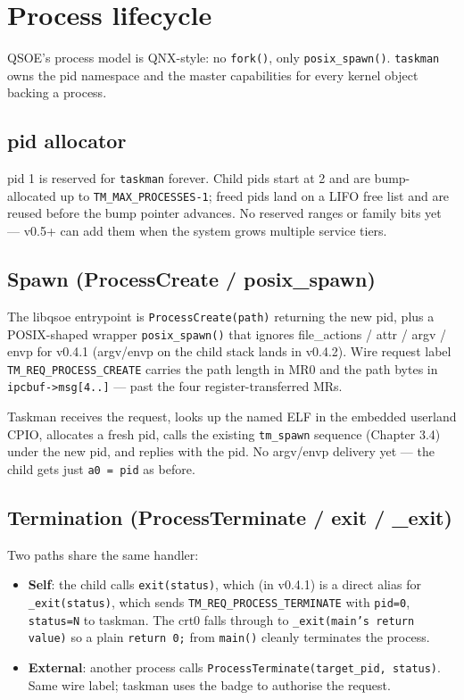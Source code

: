 \section{Process lifecycle}
\label{sec:process-lifecycle}

QSOE's process model is QNX-style: no \texttt{fork()}, only
\texttt{posix\_spawn()}.
\texttt{taskman} owns the pid namespace and the master capabilities
for every kernel object backing a process.

\subsection{pid allocator}

pid 1 is reserved for \texttt{taskman} forever.  Child pids start at
2 and are bump-allocated up to \texttt{TM\_MAX\_PROCESSES-1}; freed
pids land on a LIFO free list and are reused before the bump pointer
advances.  No reserved ranges or family bits yet --- v0.5+ can add
them when the system grows multiple service tiers.

\subsection{Spawn (ProcessCreate / posix\_spawn)}

The libqsoe entrypoint is \texttt{ProcessCreate(path)} returning the
new pid, plus a POSIX-shaped wrapper \texttt{posix\_spawn()} that
ignores file\_actions / attr / argv / envp for v0.4.1 (argv/envp on
the child stack lands in v0.4.2).  Wire request label
\texttt{TM\_REQ\_PROCESS\_CREATE} carries the path length in MR0 and
the path bytes in \texttt{ipcbuf->msg[4..]} --- past the four
register-transferred MRs.

Taskman receives the request, looks up the named ELF in the embedded
userland CPIO, allocates a fresh pid, calls the existing
\texttt{tm\_spawn} sequence (Chapter 3.4) under the new pid, and
replies with the pid.  No argv/envp delivery yet --- the child gets
just \texttt{a0 = pid} as before.

\subsection{Termination (ProcessTerminate / exit / \_exit)}

Two paths share the same handler:

\begin{itemize}
    \item \textbf{Self}: the child calls \texttt{exit(status)}, which
          (in v0.4.1) is a direct alias for \texttt{\_exit(status)},
          which sends \texttt{TM\_REQ\_PROCESS\_TERMINATE} with
          \texttt{pid=0}, \texttt{status=N} to taskman.  The crt0
          falls through to \texttt{\_exit(main's return value)} so a
          plain \texttt{return 0;} from \texttt{main()} cleanly
          terminates the process.
    \item \textbf{External}: another process calls
          \texttt{ProcessTerminate(target\_pid, status)}.  Same wire
          label; taskman uses the badge to authorise the request.
\end{itemize}

